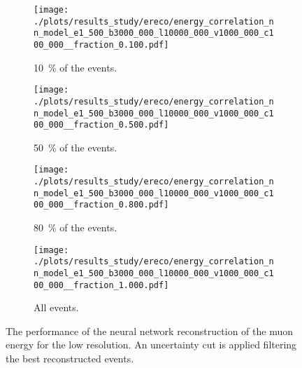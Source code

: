 \begin{figure}[H]
    \centering
    \begin{subfigure}{0.48\textwidth}
        \centering
        \texttt{[image: ./plots/results\_study/ereco/energy\_correlation\_nn\_model\_e1\_500\_b3000\_000\_l10000\_000\_v1000\_000\_c100\_000\_\_fraction\_0.100.pdf]}
        \caption{\SI{10}{\%} of the events.}
        \label{fig:study_ereco_nn_low_perform_0.1}
    \end{subfigure}
    \hfill
    \begin{subfigure}{0.48\textwidth}
        \centering
        \texttt{[image: ./plots/results\_study/ereco/energy\_correlation\_nn\_model\_e1\_500\_b3000\_000\_l10000\_000\_v1000\_000\_c100\_000\_\_fraction\_0.500.pdf]}
        \caption{\SI{50}{\%} of the events.}
        \label{fig:study_ereco_nn_low_perform_0.5}
    \end{subfigure}
    \begin{subfigure}{0.48\textwidth}
        \vspace{0.5cm}
        \centering
        \texttt{[image: ./plots/results\_study/ereco/energy\_correlation\_nn\_model\_e1\_500\_b3000\_000\_l10000\_000\_v1000\_000\_c100\_000\_\_fraction\_0.800.pdf]}
        \caption{\SI{80}{\%} of the events.}
        \label{fig:study_ereco_nn_low_perform_0.8}
    \end{subfigure}
    \hfill
    \begin{subfigure}{0.48\textwidth}
        \vspace{0.5cm}
        \centering
        \texttt{[image: ./plots/results\_study/ereco/energy\_correlation\_nn\_model\_e1\_500\_b3000\_000\_l10000\_000\_v1000\_000\_c100\_000\_\_fraction\_1.000.pdf]}
        \caption{All events.}
        \label{fig:study_ereco_nn_low_perform_1.0}
    \end{subfigure}
    \caption{The performance of the neural network reconstruction of the muon energy for the low resolution. An uncertainty cut is applied filtering the best reconstructed events.}
    \label{fig:study_ereco_nn_low_perform}
\end{figure}

